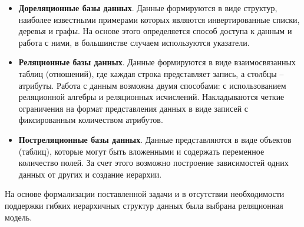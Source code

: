 \begin{itemize}
	\item \textbf{Дореляционные базы данных}. Данные формируются в виде структур, наиболее известными примерами которых являются инвертированные списки, деревья и графы. На основе этого определяется способ доступа к данным и работа с ними, в большинстве случаем используются указатели.
%	
	\item \textbf{Реляционные базы данных}. Данные формируются в виде взаимосвязанных таблиц (отношений), где каждая строка представляет запись, а столбцы -- атрибуты. Работа с данным возможна двумя способами: с использованием реляционной алгебры и реляционных исчислений. Накладываются четкие ограничения на формат представления данных в виде записей с фиксированным количеством атрибутов.
	\item \textbf{Постреляционные базы данных}. Данные представляются в виде объектов (таблиц), которые могут быть вложенными и содержать переменное количество полей. За счет этого возможно построение зависимостей одних данных от других и создание иерархии.
	
\end{itemize}

На основе формализации поставленной задачи и в отсутствии необходимости поддержки гибких иерархичных структур данных была выбрана реляционная модель.



